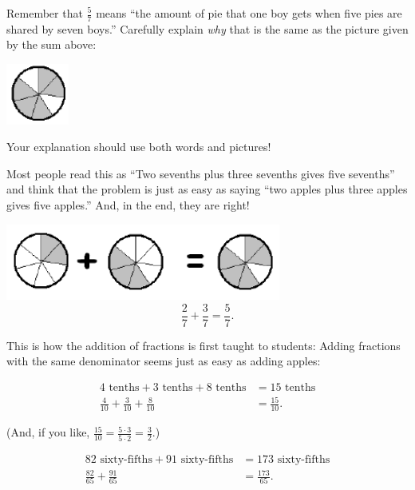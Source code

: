 \begin{thinkpair*}
Remember that $\frac 5 7$ means ``the amount of pie that one boy gets when five pies are shared by seven boys.''  Carefully explain \emph{why} that is the same as the picture given by the sum above:
    \begin{center}
\includegraphics[height = 2cm]{sumseventhspie}
\end{center}
Your explanation should use both words and pictures!


\end{thinkpair*}




Most people read this as ``Two sevenths plus three sevenths gives five sevenths''
and think that the problem is just as easy as saying ``two apples plus three apples
gives five apples.'' And, in the end, they are right!
   \begin{center}
\includegraphics[height = 2.5cm]{addseventhspie}
\[
\frac 2 7 + \frac 3 7 = \frac 5 7.
\]
\end{center}

This is how the addition of fractions is first taught to students: Adding fractions
with the same denominator seems just as easy as adding apples:


\begin{align*}
4 \text{ tenths} + 3 \text{ tenths} + 8 \text{ tenths} & = 15 \text{ tenths}\\
\frac 4 {10} + \frac 3 {10} + \frac 8 {10} &= \frac{15}{10}.
\end{align*}

(And, if you like,
$\frac{15}{10} = \frac{5\cdot 3}{5\cdot 2} = \frac 3 2$.)


\begin{align*}
82 \text{ sixty-fifths} + 91 \text{ sixty-fifths} & = 173 \text{ sixty-fifths}\\
\frac {82} {65} + \frac {91} {65}  &= \frac{173}{65}.
\end{align*}

